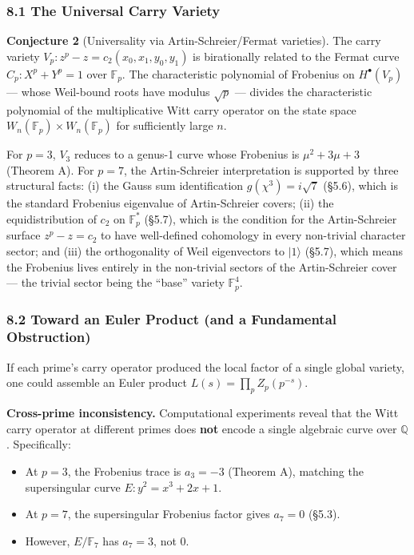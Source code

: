\documentclass[
  11pt,
]{article}
\providecommand{\tightlist}{%
  \setlength{\itemsep}{0pt}\setlength{\parskip}{0pt}}
\begin{document}
\subsubsection{8.1 The Universal Carry
Variety}\label{the-universal-carry-variety}

\textbf{Conjecture 2} (Universality via Artin-Schreier/Fermat varieties). The
carry variety \(V_p: z^p - z = c_2(x_0, x_1, y_0, y_1)\) is birationally related
to the Fermat curve \(C_p: X^p + Y^p = 1\) over \(\mathbb{F}_p\). The
characteristic polynomial of Frobenius on \(H^{\bullet}(V_p)\) --- whose
Weil-bound roots have modulus \(\sqrt{p}\) --- divides the characteristic
polynomial of the multiplicative Witt carry operator on the state space
\(W_n(\mathbb{F}_p) \times W_n(\mathbb{F}_p)\) for sufficiently large \(n\).

For \(p = 3\), \(V_3\) reduces to a genus-1 curve whose Frobenius is
\(\mu^2 + 3\mu + 3\) (Theorem A). For \(p = 7\), the Artin-Schreier
interpretation is supported by three structural facts: (i) the Gauss sum
identification \(g(\chi^3) = i\sqrt{7}\) (§5.6), which is the standard Frobenius
eigenvalue of Artin-Schreier covers; (ii) the equidistribution of \(c_2\) on
\(\mathbb{F}_p^{\ast}\) (§5.7), which is the condition for the Artin-Schreier
surface \(z^p - z = c_2\) to have well-defined cohomology in every non-trivial
character sector; and (iii) the orthogonality of Weil eigenvectors to
\(\lvert 1\rangle\) (§5.7), which means the Frobenius lives entirely in the
non-trivial sectors of the Artin-Schreier cover --- the trivial sector being the
``base'' variety \(\mathbb{F}_p^4\).

\subsubsection{8.2 Toward an Euler Product (and a Fundamental
Obstruction)}\label{toward-an-euler-product-and-a-fundamental-obstruction}

If each prime's carry operator produced the local factor of a single global
variety, one could assemble an Euler product \(L(s) = \prod_p Z_p(p^{-s})\).

\textbf{Cross-prime inconsistency.} Computational experiments reveal that the
Witt carry operator at different primes does \textbf{not} encode a single
algebraic curve over \(\mathbb{Q}\). Specifically:

\begin{itemize}
\tightlist
\item
  At \(p = 3\), the Frobenius trace is \(a_3 = -3\) (Theorem A), matching the
  supersingular curve \(E: y^2 = x^3 + 2x + 1\).
\item
  At \(p = 7\), the supersingular Frobenius factor gives \(a_7 = 0\) (§5.3).
\item
  However, \(E/\mathbb{F}_7\) has \(a_7 = 3\), not \(0\).
\end{itemize}
\end{document}
